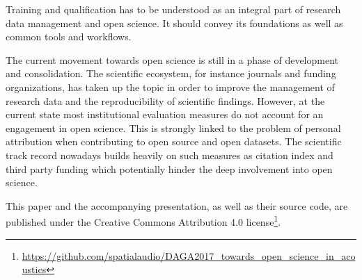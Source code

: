 \documentclass[a4paper, 10pt, twocolumn]{article}
\begin{document}
Training and qualification has to be understood as an integral part of research data 
management and open science. It should convey its foundations as well as common tools 
and workflows.

The current movement towards open science is still in a phase of development and 
consolidation. The scientific ecosystem, for instance journals and funding organizations, 
has taken up the topic in order to improve the management of research data and the 
reproducibility of scientific findings. However, at the current state most institutional 
evaluation measures do not account for an engagement in open science. This is strongly 
linked to the problem of personal attribution when contributing to open source and open 
datasets. The scientific track record nowadays builds heavily on such measures as 
citation index and third party funding which potentially hinder the deep involvement 
into open science.

This paper and the accompanying presentation, as well as their source code, are 
published under the Creative Commons Attribution 4.0 
license\footnote{\url{https://github.com/spatialaudio/DAGA2017_towards_open_science_in_acoustics}}.

{
\small


}
\end{document}
